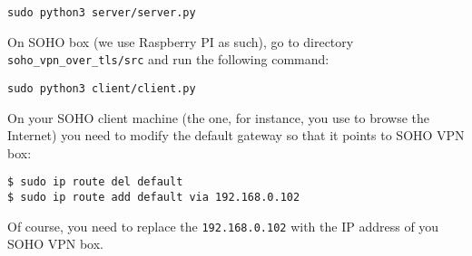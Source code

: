 \texttt{sudo python3 server/server.py}

On SOHO box (we use Raspberry PI as such), go to directory 
\texttt{soho\_vpn\_over\_tls/src} and run the following command:

\texttt{sudo python3 client/client.py}

On your SOHO client machine (the one, for instance, you use 
to browse the Internet) you need to modify the default gateway
so that it points to SOHO VPN box: 

\begin{verbatim}
$ sudo ip route del default
$ sudo ip route add default via 192.168.0.102
\end{verbatim}

Of course, you need to replace the \texttt{192.168.0.102}
with the IP address of you SOHO VPN box.